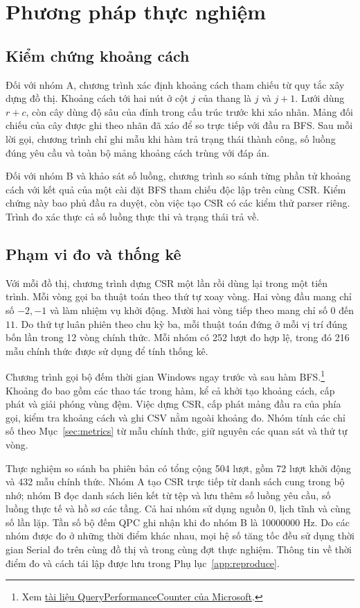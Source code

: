 \section{Phương pháp thực nghiệm}
\label{sec:measurement}
\subsection{Kiểm chứng khoảng cách}
Đối với nhóm A, chương trình xác định khoảng cách tham chiếu từ quy tắc xây dựng đồ thị. Khoảng cách tới hai nút ở cột $j$ của thang là $j$ và $j+1$. Lưới dùng $r+c$, còn cây dùng độ sâu của đỉnh trong cấu trúc trước khi xáo nhãn. Mảng đối chiếu của cây được ghi theo nhãn đã xáo để so trực tiếp với đầu ra BFS. Sau mỗi lời gọi, chương trình chỉ ghi mẫu khi hàm trả trạng thái thành công, số luồng đúng yêu cầu và toàn bộ mảng khoảng cách trùng với đáp án.

Đối với nhóm B và khảo sát số luồng, chương trình so sánh từng phần tử khoảng cách với kết quả của một cài đặt BFS tham chiếu độc lập trên cùng CSR. Kiểm chứng này bao phủ đầu ra duyệt, còn việc tạo CSR có các kiểm thử parser riêng. Trình đo xác thực cả số luồng thực thi và trạng thái trả về.

\subsection{Phạm vi đo và thống kê}
Với mỗi đồ thị, chương trình dựng CSR một lần rồi dùng lại trong một tiến trình. Mỗi vòng gọi ba thuật toán theo thứ tự xoay vòng. Hai vòng đầu mang chỉ số $-2,-1$ và làm nhiệm vụ khởi động. Mười hai vòng tiếp theo mang chỉ số $0$ đến $11$. Do thứ tự luân phiên theo chu kỳ ba, mỗi thuật toán đứng ở mỗi vị trí đúng bốn lần trong 12 vòng chính thức. Mỗi nhóm có 252 lượt đo hợp lệ, trong đó 216 mẫu chính thức được sử dụng để tính thống kê.

Chương trình gọi bộ đếm thời gian Windows ngay trước và sau hàm BFS.\footnote{Xem \href{https://learn.microsoft.com/en-us/windows/win32/api/profileapi/nf-profileapi-queryperformancecounter}{tài liệu QueryPerformanceCounter của Microsoft}.} Khoảng đo bao gồm các thao tác trong hàm, kể cả khởi tạo khoảng cách, cấp phát và giải phóng vùng đệm. Việc dựng CSR, cấp phát mảng đầu ra của phía gọi, kiểm tra khoảng cách và ghi CSV nằm ngoài khoảng đo. Nhóm tính các chỉ số theo Mục~\ref{sec:metrics} từ mẫu chính thức, giữ nguyên các quan sát và thứ tự vòng.

Thực nghiệm so sánh ba phiên bản có tổng cộng 504 lượt, gồm 72 lượt khởi động và 432 mẫu chính thức. Nhóm A tạo CSR trực tiếp từ danh sách cung trong bộ nhớ; nhóm B đọc danh sách liên kết từ tệp và lưu thêm số luồng yêu cầu, số luồng thực tế và hồ sơ các tầng. Cả hai nhóm sử dụng nguồn $0$, lịch tĩnh và cùng số lần lặp. Tần số bộ đếm QPC ghi nhận khi đo nhóm B là \num{10000000} Hz. Do các nhóm được đo ở những thời điểm khác nhau, mọi hệ số tăng tốc đều sử dụng thời gian Serial đo trên cùng đồ thị và trong cùng đợt thực nghiệm. Thông tin về thời điểm đo và cách tái lập được lưu trong Phụ lục~\ref{app:reproduce}.

